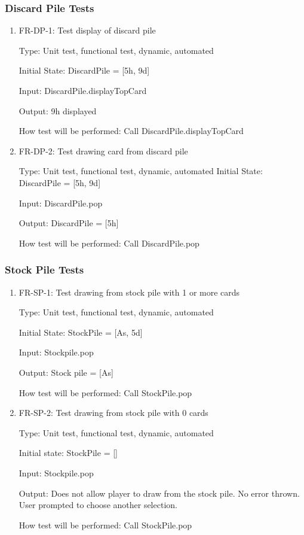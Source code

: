 \documentclass[12pt, titlepage]{article}
\begin{document}
\subsubsection{Discard Pile Tests}
\begin{enumerate}
    \item{FR-DP-1: Test display of discard pile\\}
    
    Type: Unit test, functional test, dynamic, automated 
    					
    Initial State: DiscardPile = [5h, 9d]
    
    Input: DiscardPile.displayTopCard
    
    Output: 9h displayed
    					
    How test will be performed: Call DiscardPile.displayTopCard
    
    \item{FR-DP-2: Test drawing card from discard pile\\}
    
    Type: Unit test, functional test, dynamic, automated 
    Initial State: DiscardPile = [5h, 9d]

    Input: DiscardPile.pop
        
    Output: DiscardPile = [5h]
    					
    How test will be performed: Call DiscardPile.pop
\end{enumerate}

\subsubsection{Stock Pile Tests}
\begin{enumerate}
    \item{FR-SP-1: Test drawing from stock pile with 1 or more cards\\}
    
    Type: Unit test, functional test, dynamic, automated 
    					
    Initial State: StockPile = [As, 5d]
    
    Input: Stockpile.pop
    
    Output: Stock pile = [As]
    
    How test will be performed: Call StockPile.pop
    
    \item{FR-SP-2: Test drawing from stock pile with 0 cards\\}
    
    Type: Unit test, functional test, dynamic, automated
    
    Initial state: StockPile = []
    
    Input: Stockpile.pop
    
    Output: Does not allow player to draw from the stock pile. No error thrown. User prompted to choose another selection.
    					
    How test will be performed: Call StockPile.pop
\end{enumerate}
\end{document}
